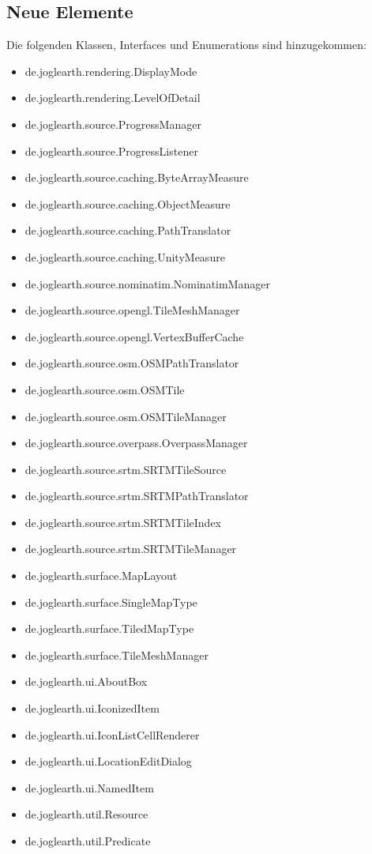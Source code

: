 \documentclass[10pt]{scrreprt}
\renewcommand{\bf}{\sffamily\bfseries}
\begin{document}
\subsection*{Neue Elemente}
Die folgenden Klassen, Interfaces und Enumerations sind hinzugekommen:

\begin{itemize}
\item de.joglearth.rendering.DisplayMode
\item de.joglearth.rendering.LevelOfDetail
\item de.joglearth.source.ProgressManager
\item de.joglearth.source.ProgressListener
\item de.joglearth.source.caching.ByteArrayMeasure
\item de.joglearth.source.caching.ObjectMeasure
\item de.joglearth.source.caching.PathTranslator
\item de.joglearth.source.caching.UnityMeasure
\item de.joglearth.source.nominatim.NominatimManager
\item de.joglearth.source.opengl.TileMeshManager
\item de.joglearth.source.opengl.VertexBufferCache
\item de.joglearth.source.osm.OSMPathTranslator
\item de.joglearth.source.osm.OSMTile
\item de.joglearth.source.osm.OSMTileManager
\item de.joglearth.source.overpass.OverpassManager
\item de.joglearth.source.srtm.SRTMTileSource
\item de.joglearth.source.srtm.SRTMPathTranslator
\item de.joglearth.source.srtm.SRTMTileIndex
\item de.joglearth.source.srtm.SRTMTileManager
\item de.joglearth.surface.MapLayout
\item de.joglearth.surface.SingleMapType
\item de.joglearth.surface.TiledMapType
\item de.joglearth.surface.TileMeshManager
\item de.joglearth.ui.AboutBox
\item de.joglearth.ui.IconizedItem
\item de.joglearth.ui.IconListCellRenderer
\item de.joglearth.ui.LocationEditDialog
\item de.joglearth.ui.NamedItem
\item de.joglearth.util.Resource
\item de.joglearth.util.Predicate
\end{itemize}

%
\end{document}
